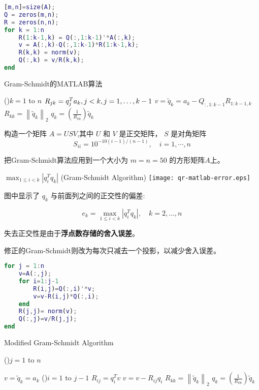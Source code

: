 \begin{example}
    \begin{lstlisting}[caption=Gram Schmidt算法,language=matlab]
[m,n]=size(A);
Q = zeros(m,n);
R = zeros(n,n);
for k = 1:n
    R(1:k-1,k) = Q(:,1:k-1)'*A(:,k);
    v = A(:,k)-Q(:,1:k-1)*R(1:k-1,k);
    R(k,k) = norm(v);
    Q(:,k) = v/R(k,k);
end
    \end{lstlisting}

    \begin{algorithm}[htbp]
        \caption{Gram-Schmidt的MATLAB算法}
        \For(){$k = 1$ to $n$}{
            $R_{ {jk}} =q_j^T a_k ,j<k,j=1,\ldotp \ldotp \ldotp ,k-1$\;
            $v={\tilde{q} }_k =a_k -Q_{:,1:k-1} R_{1:k-1,k}$\;
            $R_{ {kk}} ={\left\|{\tilde{q} }_k \right\|}_2$\;
            $q_k =\left(\frac{1}{R_{kk} }\right){\tilde{q} }_k$\;
        }
    \end{algorithm}

    构造一个矩阵 $ A=U S V $,其中 $ U $ 和 $ V $ 是正交矩阵， $ S $ 是对角矩阵
    $$
    S_{i i}=10^{-10(i-1) /(n-1)}, \quad i=1, \cdots, n
    $$

    把Gram-Schmidt算法应用到一个大小为 $  {m}= {n}=50 $ 的方形矩阵$A$上。

    \begin{FigureCenter}{$\max _{1 \leq i<k}\left|q_{i}^{T} q_{k}\right|$ (Gram-Schmidt Algorithm)}
        \texttt{[image: qr-matlab-error.eps]}
    \end{FigureCenter}


    图中显示了 $ q_{k} $ 与前面列之间的正交性的偏差:

    $$
    e_{k}=\max _{1 \leq i<k}\left|q_{i}^{T} q_{k}\right|, \quad k=2, \ldots, n
    $$

    失去正交性是由于\textbf{浮点数存储的舍入误差}。

    修正的Gram-Schmidt则改为每次只减去一个投影，以减少舍入误差。

    \begin{lstlisting}[caption=modified Gram-Schmidt算法,language=matlab]
for j = 1:n
    v=A(:,j);
    for i=1:j-1
        R(i,j)=Q(:,i)'*v;
        v=v-R(i,j)*Q(:,i);
    end
    R(j,j)= norm(v);
    Q(:,j)=v/R(j,j);
end
    \end{lstlisting}

    \begin{algorithm}[htbp]
        \caption{Modified Gram-Schmidt Algorithm}
        \For(){$j=1$ to $n$}{
            $v={\tilde{q} }_k =a_k$\;
            \For(){$i=1$ to $j-1$}{
                $R_{ij} = q_i^T v$\;
                $v = v - R_{ij} q_i$\;
            }
            $R_{ {kk}} ={\left\|{\tilde{q} }_k \right\|}_2$\;
            $q_k =\left(\frac{1}{R_{kk} }\right){\tilde{q} }_k$\;

}
\end{algorithm}
\end{example}

